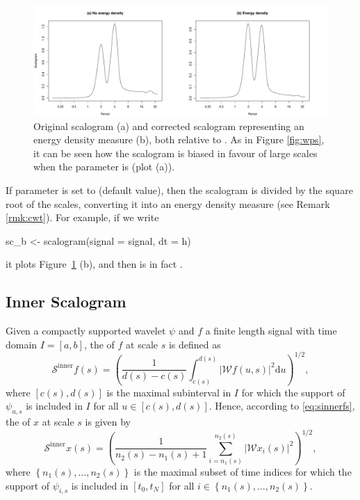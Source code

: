 \begin{figure}[tbp]
\begin{center}
  \includegraphics[width=1\textwidth]{Figure4}
\end{center}
\caption{Original scalogram (a) and corrected scalogram representing an energy density measure (b), both relative to . As in Figure \ref{fig:wps}, it can be seen how the scalogram is biased in favour of large scales when the parameter  is  (plot (a)).} 
\label{fig:sc}
\end{figure}

If parameter  is set to  (default value), then the scalogram is divided by the square root of the scales, converting it into an energy density measure (see Remark \ref{rmk:cwt}). For example, if we write
\begin{example}
sc_b <- scalogram(signal = signal, dt = h)
\end{example}
it plots Figure~\ref{fig:sc} (b), and then  is in fact .

\subsection{Inner Scalogram}

Given a compactly supported wavelet $\psi $ and $f$ a finite length signal with time domain $I=\left[ a,b\right] $, the  of $f$ at scale $s$ is defined as
\begin{equation}
\label{eq:sinnerfs}
\mathcal{S}^{\textrm{inner}}f\left( s\right) =\left( \frac{1}{d(s)-c(s)} \int _{c(s)}^{d(s)} | \mathcal{W}f\left( u,s\right) |^2 \textrm{d}u\right) ^{1/2},
\end{equation}
where $\left[ c(s),d(s)\right] $ is the maximal subinterval in $I$ for which the support of $\psi _{u,s}$ is included in $I$ for all $u\in \left[ c(s),d(s)\right] $.
Hence, according to \eqref{eq:sinnerfs}, the  of $x$ at scale $s$ is given by
\[
\mathcal{S}^{\mathrm{inner}}x(s) = \left( \frac{1}{n_2(s)-n_1(s)+1}\sum _{i=n_1(s)}^{n_2(s)} | \mathcal{W}x_i(s) | ^2 \right) ^{1/2},
\]
where $\left\{ n_1(s),\ldots ,n_2(s)\right\} $ is the maximal subset of time indices for which the support of $\psi _{i,s}$ is included in $\left[ t_0,t_N\right] $ for all $i\in \left\{ n_1(s),\ldots ,n_2(s)\right\} $.

